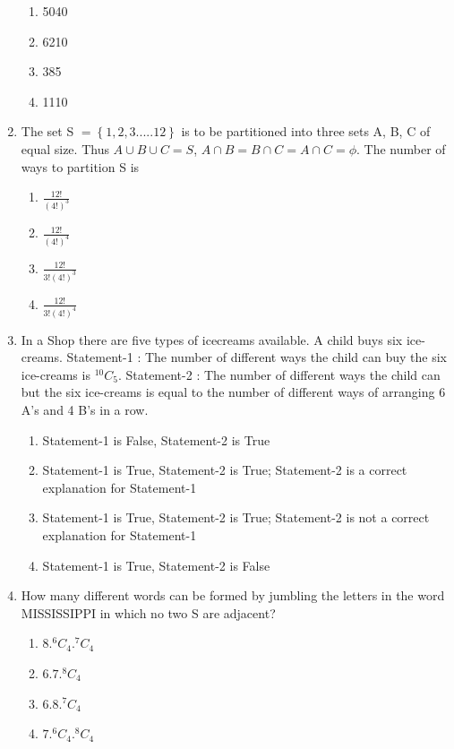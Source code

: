 \documentclass[journal,12pt,twocolumn]{IEEEtran}
\newcommand*{\Comb}[2]{{}^{#1}C_{#2}}%
\begin{document}
\begin{enumerate}
\begin{enumerate}
\item 5040
\item 6210 
\item 385
\item 1110\\
\end{enumerate} 
\item The set S $= \left\lbrace1,2,3.....12\right\rbrace$ is to be partitioned into three sets A, B, C of equal size. Thus $A \cup B \cup C = S$, $A \cap B=B \cap C=A \cap C= \phi$. The number of ways to partition S is 
\begin{enumerate}
\item $\frac{12!}{(4!)^3}$
\item $\frac{12!}{(4!)^4}$
\item $\frac{12!}{3!(4!)^3}$
\item $\frac{12!}{3!(4!)^4}$\\
\end{enumerate} 
\item In a Shop there are five types of icecreams available. A child buys six ice-creams.
Statement-1 : The number of different ways the child can buy the six ice-creams is $\Comb{10}{5}$.
Statement-2 : The number of different ways the child can but the six ice-creams is equal to the number of different ways of arranging 6 A's and 4 B's in a row.
\begin{enumerate}
\item Statement-1 is False, Statement-2 is True
\item Statement-1 is True, Statement-2 is True; Statement-2 is a correct explanation for Statement-1
\item Statement-1 is True, Statement-2 is True; Statement-2 is not a correct explanation for Statement-1
\item Statement-1 is True, Statement-2 is False\\ 
\end{enumerate}
\item How many different words can be formed by jumbling the letters in the word MISSISSIPPI in which no two S are adjacent?
\begin{enumerate}
\item $8.\Comb{6}{4}.\Comb{7}{4}$
\item $6.7.\Comb{8}{4}$
\item $6.8.\Comb{7}{4}$
\item $7.\Comb{6}{4}.\Comb{8}{4}$\\
\end{enumerate}   

\end{enumerate}
\end{document}
